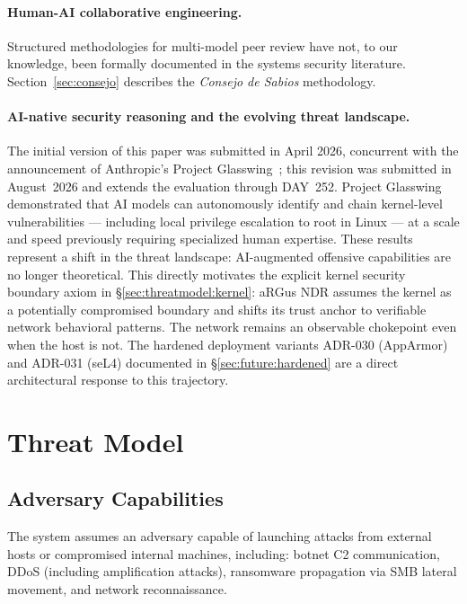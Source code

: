 \documentclass[11pt,a4paper]{article}
\begin{document}
    \paragraph{Human-AI collaborative engineering.}
    Structured methodologies for multi-model peer review have not, to our knowledge, been
    formally documented in the systems security literature. Section~\ref{sec:consejo} describes
    the \emph{Consejo de Sabios} methodology.

    \paragraph{AI-native security reasoning and the evolving threat landscape.}
    \label{sec:background:ai}
    The initial version of this paper was submitted in April 2026, concurrent with the
    announcement of Anthropic's Project Glasswing~\cite{anthropic2026glasswing}; this
    revision was submitted in August~2026 and extends the evaluation through DAY~252.
    Project Glasswing demonstrated that AI models can autonomously identify and chain
    kernel-level vulnerabilities --- including local privilege escalation to
    root in Linux --- at a scale and speed previously requiring specialized
    human expertise. These results represent a shift in the threat landscape:
    AI-augmented offensive capabilities are no longer theoretical.
    This directly motivates the explicit kernel security boundary axiom in
    \S\ref{sec:threatmodel:kernel}: aRGus NDR assumes the kernel as a
    potentially compromised boundary and shifts its trust anchor to
    verifiable network behavioral patterns. The network remains an observable
    chokepoint even when the host is not. The hardened deployment variants
    ADR-030 (AppArmor) and ADR-031 (seL4) documented in
    \S\ref{sec:future:hardened} are a direct architectural response to this
    trajectory.


    \section{Threat Model}

    \subsection{Adversary Capabilities}
    The system assumes an adversary capable of launching attacks from external hosts or
    compromised internal machines, including: botnet C2 communication, DDoS (including
    amplification attacks), ransomware propagation via SMB lateral movement, and network
    reconnaissance.
\end{document}

